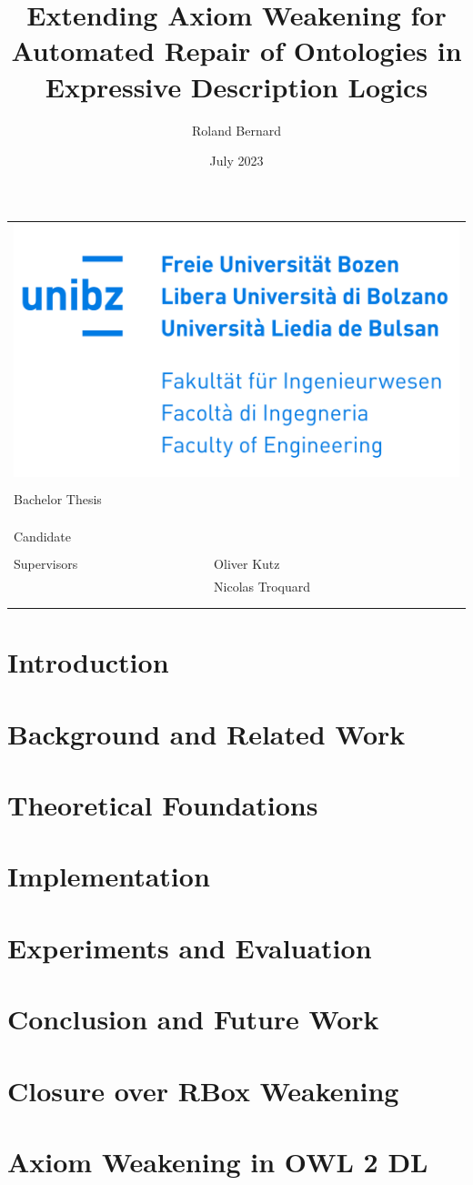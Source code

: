 \documentclass[10pt,a4paper]{report}
\title{Extending Axiom Weakening for Automated Repair of Ontologies in Expressive Description Logics}
\author{Roland Bernard}
\date{July 2023}
\makeatletter
\theoremstyle{plain}
\theoremstyle{definition}
\theoremstyle{remark}
\def\maketitle{
    \begin{tabular}{ll}
        \multicolumn{2}{r}{\includegraphics[width=0.5\linewidth]{resources/unibz-logo.png}} \\
        \vspace*{40mm} \\
        \multicolumn{2}{l}{\raggedright Bachelor Thesis} \\
        \vspace*{1mm} \\
        \multicolumn{2}{p{\linewidth}}{\raggedright \huge \bf \@title} \\
        \vspace*{30mm} \\
        Candidate   & \@author \\
        \vspace*{5mm} \\
        Supervisors & Oliver Kutz \\
                    & Nicolas Troquard \\
        \vspace*{20mm} \\
        \multicolumn{2}{p{\linewidth}}{\@date}
    \end{tabular}
}
\makeatother
\begin{document}
\maketitle

\begin{abstract}
    
\end{abstract}

\tableofcontents

\begingroup
\renewcommand{\abstractname}{Acknowledgements}
\begin{abstract}
    
\end{abstract}
\endgroup

\chapter{Introduction} \label{introduction}



\chapter{Background and Related Work} \label{background}



\chapter{Theoretical Foundations} \label{theory}



\chapter{Implementation} \label{implementation}



\chapter{Experiments and Evaluation} \label{evaluation}



\chapter{Conclusion and Future Work} \label{conclusion}



\printbibliography

\appendix

\chapter{Closure over RBox Weakening} \label{proof-weakening}



\chapter{Axiom Weakening in OWL 2 DL} \label{weakening-owl-2-dl}


\end{document}
